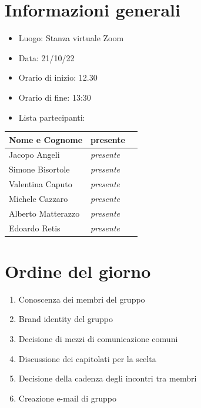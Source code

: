 \documentclass[12pt]{article}
\begin{document}

\clearpage


\tableofcontents
\clearpage

\section{Informazioni generali} 
\begin{itemize}
    \item Luogo: Stanza virtuale Zoom
    \item Data: 21/10/22
    \item Orario di inizio: 12.30
    \item Orario di fine: 13:30
    \item Lista partecipanti:
\end{itemize}
\begin{center}
\begin{tabularx}{0.8\textwidth} { 
   >{\raggedright\arraybackslash}X 
   >{\centering\arraybackslash}X 
   >{\raggedleft\arraybackslash}X  }
\hline
    \textbf{Nome e Cognome} &        \textbf{presente}\\
\hline
    Jacopo Angeli           &        \emph{presente}\\
    Simone Bisortole        &        \emph{presente}\\
    Valentina Caputo        &        \emph{presente}\\
    Michele Cazzaro         &        \emph{presente}\\
    Alberto Matterazzo       &        \emph{presente}\\
    Edoardo Retis           &        \emph{presente}\\
\end{tabularx}
\end{center}

\vspace{5mm}

\section{Ordine del giorno}
\begin{enumerate}
    \item   Conoscenza dei membri del gruppo
    \item   Brand identity del gruppo
    \item   Decisione di mezzi di comunicazione comuni
    \item   Discussione dei capitolati per la scelta
    \item   Decisione della cadenza degli incontri tra membri
    \item   Creazione e-mail di gruppo
\end{enumerate}
\end{document}
